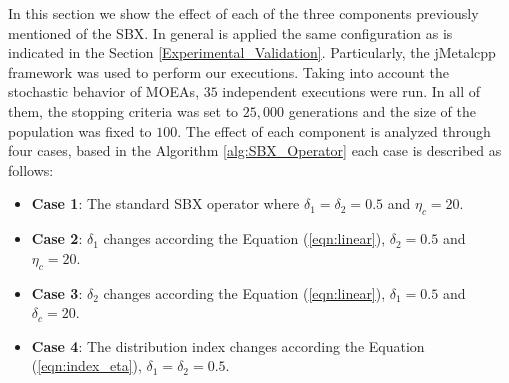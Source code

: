 In this section we show the effect of each of the three components previously mentioned of the SBX.
%
In general is applied the same configuration as is indicated in the Section \ref{Experimental_Validation}.
%
Particularly, the jMetalcpp \cite{Joel:jMetal} framework was used to perform our executions.
%
Taking into account the stochastic behavior of MOEAs, $35$ independent executions were run.
%
In all of them, the stopping criteria was set to $25,000$ generations and the size of the population was fixed to $100$.
%
The effect of each component is analyzed through four cases, based in the Algorithm \ref{alg:SBX_Operator} each case is described as follows:
\begin{itemize}
\item \textbf{Case 1}: The standard SBX operator where $\delta_1 = \delta_2 = 0.5$ and $\eta_c = 20$.
\item \textbf{Case 2}: $\delta_1$ changes according the Equation (\ref{eqn:linear}),  $\delta_2=0.5$ and $\eta_c = 20$.
\item \textbf{Case 3}: $\delta_2$ changes according the Equation (\ref{eqn:linear}), $\delta_1=0.5$ and $\delta_c = 20$.
\item \textbf{Case 4}: The distribution index changes according the Equation (\ref{eqn:index_eta}), $\delta_1=\delta_2=0.5$.
\end{itemize}


